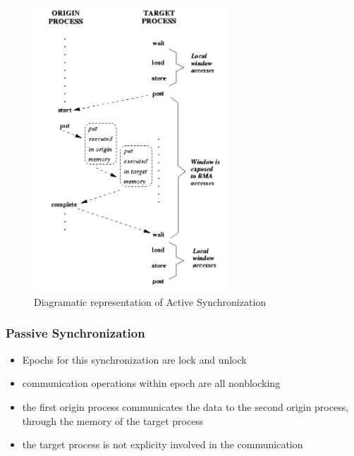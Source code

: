 \documentclass[12pt, a4paper]{report}
\begin{document}
\begin{figure}[h]
    \centering
    \includegraphics[width=0.65\textwidth]{Active_synchronization}
    \caption{Diagramatic representation of Active Synchronization}
    \label{fig:Active_synchronization}
\end{figure}

\subsubsection{Passive Synchronization}
\begin{itemize}
    \item Epochs for this synchronization are lock and unlock
    \item communication operations within epoch are all nonblocking
    \item the first origin process communicates the data to the second origin process, through the memory of the target process
    \item the target process is not explicity involved in the communication
\end{itemize}
\end{document}

